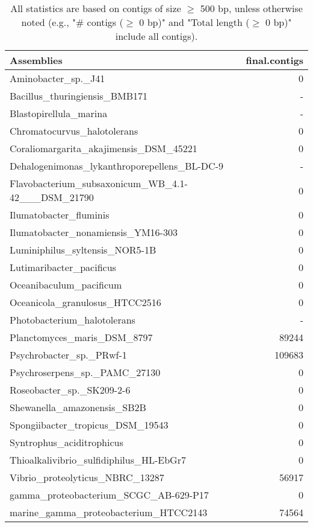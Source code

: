 \documentclass[12pt,a4paper]{article}
\begin{document}
\begin{table}[ht]
\begin{center}
\caption{All statistics are based on contigs of size $\geq$ 500 bp, unless otherwise noted (e.g., "\# contigs ($\geq$ 0 bp)" and "Total length ($\geq$ 0 bp)" include all contigs).}
\begin{tabular}{|l*{1}{|r}|}
\hline
Assemblies & final.contigs \\ \hline
Aminobacter\_sp.\_J41 & 0 \\ \hline
Bacillus\_thuringiensis\_BMB171 & - \\ \hline
Blastopirellula\_marina & - \\ \hline
Chromatocurvus\_halotolerans & 0 \\ \hline
Coraliomargarita\_akajimensis\_DSM\_45221 & 0 \\ \hline
Dehalogenimonas\_lykanthroporepellens\_BL-DC-9 & - \\ \hline
Flavobacterium\_subsaxonicum\_WB\_4.1-42\_\_\_DSM\_21790 & 0 \\ \hline
Ilumatobacter\_fluminis & 0 \\ \hline
Ilumatobacter\_nonamiensis\_YM16-303 & 0 \\ \hline
Luminiphilus\_syltensis\_NOR5-1B & 0 \\ \hline
Lutimaribacter\_pacificus & 0 \\ \hline
Oceanibaculum\_pacificum & 0 \\ \hline
Oceanicola\_granulosus\_HTCC2516 & 0 \\ \hline
Photobacterium\_halotolerans & - \\ \hline
Planctomyces\_maris\_DSM\_8797 & 89244 \\ \hline
Psychrobacter\_sp.\_PRwf-1 & 109683 \\ \hline
Psychroserpens\_sp.\_PAMC\_27130 & 0 \\ \hline
Roseobacter\_sp.\_SK209-2-6 & 0 \\ \hline
Shewanella\_amazonensis\_SB2B & 0 \\ \hline
Spongiibacter\_tropicus\_DSM\_19543 & 0 \\ \hline
Syntrophus\_aciditrophicus & 0 \\ \hline
Thioalkalivibrio\_sulfidiphilus\_HL-EbGr7 & 0 \\ \hline
Vibrio\_proteolyticus\_NBRC\_13287 & 56917 \\ \hline
gamma\_proteobacterium\_SCGC\_AB-629-P17 & 0 \\ \hline
marine\_gamma\_proteobacterium\_HTCC2143 & 74564 \\ \hline
\end{tabular}
\end{center}
\end{table}
\end{document}
